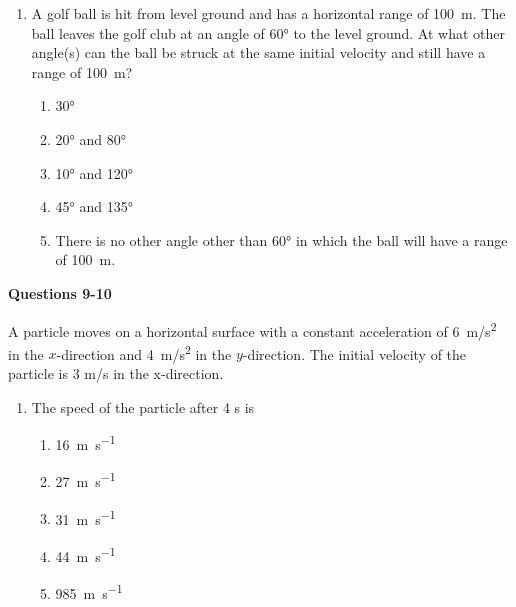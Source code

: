 \documentclass{../../oss-apphys}
\begin{document}
\begin{multicols}{2}
\begin{enumerate}[resume,leftmargin=18pt]
  \item A golf ball is hit from level ground and has a horizontal range of
    \SI{100}{m}. The ball leaves the golf club at an angle of \ang{60} to the
    level ground. At what other angle(s) can the ball be struck at the same
    initial velocity and still have a range of \SI{100}{m}?
    \begin{center}
      \vspace{-.2in}
    \end{center}
    \begin{enumerate}[noitemsep,topsep=0pt,leftmargin=18pt,label=(\Alph*)]
    \item\ang{30}
    \item\ang{20} and \ang{80}
    \item\ang{10} and \ang{120}
    \item\ang{45} and \ang{135}
    \item There is no other angle other than \ang{60} in which the ball will
      have a range of \SI{100}{m}.
    \end{enumerate}
  \end{enumerate}
  
  \textbf{Questions 9-10}

  A particle moves on a horizontal surface with a constant acceleration of
  \SI{6}{m/s^2} in the $x$-direction and \SI{4}{m/s^2} in the $y$-direction. The
  initial velocity of the particle is 3 m/s in the x-direction.
  
  \begin{enumerate}[resume,leftmargin=18pt]
  \item The speed of the particle after 4 s is
    \begin{enumerate}[noitemsep,topsep=0pt,leftmargin=18pt,label=(\Alph*)]
    \item\SI{16 }{\metre\per\second}
    \item\SI{27 }{\metre\per\second}
    \item\SI{31 }{\metre\per\second}
    \item\SI{44 }{\metre\per\second}
    \item\SI{985}{\metre\per\second}
    \end{enumerate}
    

\end{enumerate}
\end{multicols}
\end{document}
